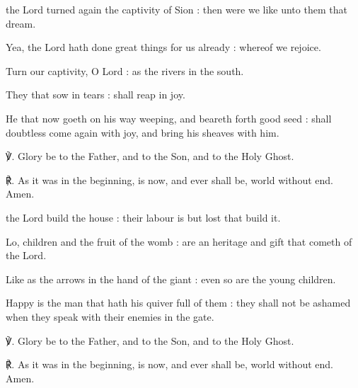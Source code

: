 
 the Lord turned again the captivity of Sion : then were we like unto them that dream.\par
{}
Yea, the Lord hath done great things for us already : whereof we rejoice.\par
{}Turn our captivity, O Lord : as the rivers in the south.\par
{}They that sow in tears : shall reap in joy.\par
{}He that now goeth on his way weeping, and beareth forth good seed : shall doubtless come again with joy, and bring his sheaves with him.\par
℣. Glory be to the Father, and to the Son, and to the Holy Ghost.\par
℟. As it was in the beginning, is now, and ever shall be, world without end. Amen.


 the Lord build the house : their labour is but lost that build it.\par
{}
Lo, children and the fruit of the womb : are an heritage and gift that cometh of the Lord.\par
{}Like as the arrows in the hand of the giant : even so are the young children.\par
{}Happy is the man that hath his quiver full of them : they shall not be ashamed when they speak with their enemies in the gate.\par
℣. Glory be to the Father, and to the Son, and to the Holy Ghost.\par
℟. As it was in the beginning, is now, and ever shall be, world without end. Amen.

\vspace{-1ex}


